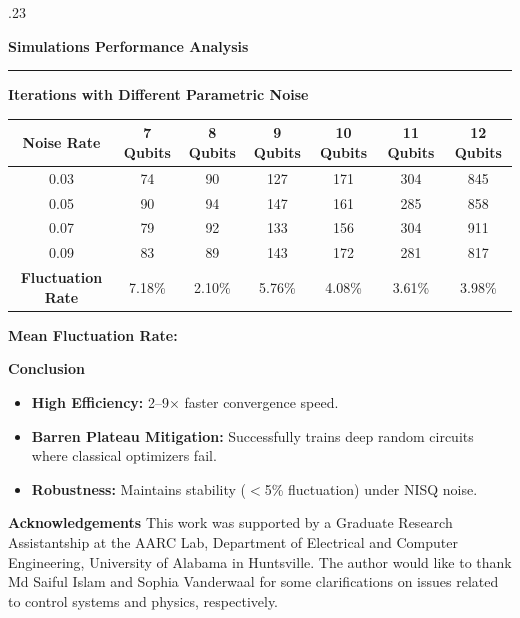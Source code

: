 \documentclass[final]{beamer}
\begin{document}
\begin{frame}[t]
\begin{columns}[t]
\begin{column}{.23\textwidth}
\begin{block}{\textbf{Simulations Performance Analysis}}

        \rule{\textwidth}{2pt}
        \textbf{\Average Iterations with Different Parametric Noise} \\
        \vspace{0.3cm}
        \scriptsize
        \renewcommand{\arraystretch}{1.2}
        \begin{tabular}{ccccccc}
        \hline
        \textbf{Noise Rate} & \textbf{7 Qubits} & \textbf{8 Qubits} & \textbf{9 Qubits} & \textbf{10 Qubits} & \textbf{11 Qubits} &\textbf{12 Qubits} \\ 
        \hline
        0.03 & 74 & 90 & 127 & 171 & 304 & 845 \\ 
        0.05  & 90 & 94 & 147 & 161 & 285 & 858 \\ 
        0.07  & 79 & 92 & 133 & 156 & 304 & 911 \\ 
        0.09 & 83 & 89 &  143 & 172 & 281 &  817 \\
        \hline
        \textbf{Fluctuation Rate} & 7.18\% & 2.10\% & 5.76\% & 4.08\% & 3.61\% &  3.98\%\\
        \hline
        \end{tabular}
        
        \vspace{0.4cm}
        \footnotesize \textbf{Mean Fluctuation Rate: }
    \end{block}

   
    \begin{block}{\textbf{Conclusion}}
        \begin{itemize}
            \item \textbf{High Efficiency:} 2--9$\times$ faster convergence speed.
            \item \textbf{Barren Plateau Mitigation:} Successfully trains deep random circuits where classical optimizers fail.
            \item \textbf{Robustness:} Maintains stability ($<$5\% fluctuation) under NISQ noise.
        \end{itemize}
    \end{block}

    \begin{block}{\textbf{Acknowledgements}}
        \small
        This work was supported by a Graduate Research Assistantship at the AARC Lab, Department of Electrical and Computer Engineering, University of Alabama in Huntsville. The author would like to thank Md Saiful Islam and Sophia Vanderwaal for some clarifications on issues related to control systems and physics, respectively.
    \end{block}


\end{column}
\end{columns}
\end{frame}
\end{document}
